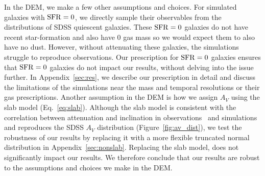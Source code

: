 In the DEM, we make a few other assumptions and choices. For simulated galaxies
with ${\rm SFR}=0$, we directly sample their observables from the distributions of 
SDSS quiescent galaxies. These ${\rm SFR}=0$ galaxies do not have recent
star-formation and also have 0 gas mass so we would expect them to also have no dust. However, without
attenuating these galaxies, the simulations struggle to reproduce observations.
Our prescription for ${\rm SFR} = 0$ galaxies ensures that ${\rm SFR}=0$ galaxies do not
impact our results, without delving into the issue further. In
Appendix~\ref{sec:res}, we describe our prescription in detail and discuss the
limitations of the simulations near the mass and temporal resolutions or their
gas prescriptions. Another assumption in the DEM is how we assign $A_V$ using 
the slab model (Eq.~\ref{eq:slab}). Although the slab model is consistent with
the correlation between attenuation and inclination in
observations~\citep[\eg][]{conroy2010b, salim2020} and
simulations~\citep[\eg]{chevallard2013, narayanan2018, trayford2020} and
reproduces the SDSS $A_V$ distribution (Figure~\ref{fig:av_dist}),
we test the robustness of our results by replacing it with a more flexible
truncated normal distribution in Appendix~\ref{sec:nonslab}. Replacing the slab
model, does not significantly impact our results. We therefore conclude that
our results are robust to the assumptions and choices we make in the DEM. 



